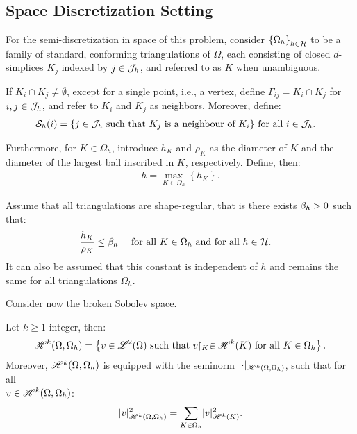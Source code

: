 \subsection{Space Discretization Setting}

For the semi-discretization in space of this problem, consider $\left\{ \Omega_{h} \right\}_{h \in \mathcal{H}}$ to be a family of standard, conforming triangulations of $\Omega$, each consisting of closed $d$-simplices $K_j$ indexed by $j \in \mathcal{J}_h$, and referred to as $K$ when unambiguous. %

If $K_i \cap K_j \neq \emptyset$, except for a single point, i.e., a vertex, define $\Gamma_{ij} = K_i \cap K_j$ for $i, j \in \mathcal{J}_h$, and refer to $K_i$ and $K_j$ as neighbors. Moreover, define:
\begin{align}
    \mathcal{S}_h(i) = \left\{ j \in \mathcal{J}_h \text{ such that } K_j \text{ is a neighbour of } K_i \right\} &\text{ for all } i \in \mathcal{J}_h.
\end{align}

Furthermore, for $K \in \Omega_h$, introduce $h_K$ and $\rho_K$ as the diameter of $K$ and the diameter of the largest ball inscribed in $K$, respectively. Define, then:
\begin{align}
    h = \max_{K \in \Omega_h} \left\{ h_K \right\}.
\end{align}

Assume that all triangulations are shape-regular, that is there exists $\beta_{h} > 0$ such that:
\begin{align}
    \frac{h_K}{\rho_K} &\leq \beta_{h} &\text{ for all } K \in \Omega_h &\text{ and for all } h \in \mathcal{H}.
\end{align}
It can also be assumed that this constant is independent of $h$ and remains the same for all triangulations $\Omega_h$.

Consider now the broken Sobolev space.
\begin{definition} %
    Let $k \geq 1$ integer, then:
    \begin{align}
        \mathscr{H}^{k}(\Omega, \Omega_h) = \left\{ v \in \mathscr{L}^{2}(\Omega) \text{ such that } v \!\!\restriction_{K} \in \mathscr{H}^{k}(K) \text{ for all } K \in \Omega_h \right\}.
    \end{align}
    Moreover, $\mathscr{H}^{k}(\Omega, \Omega_h)$ is equipped with the seminorm $\lvert \cdot \rvert_{\mathscr{H}^{k}(\Omega, \Omega_h)}$, such that for all \\ $v \in \mathscr{H}^{k}(\Omega, \Omega_h)$:
    \begin{align}
        \lvert v \rvert_{\mathscr{H}^{k}(\Omega, \Omega_h)}^2 = \sum_{K \in \Omega_h} \lvert v \rvert_{\mathscr{H}^{k}(K)}^2.
    \end{align}
\end{definition}


